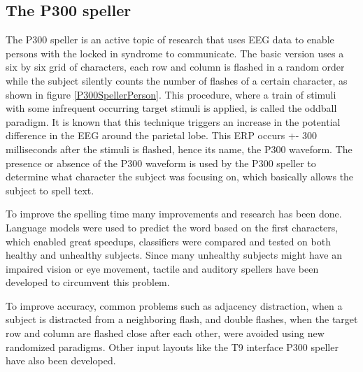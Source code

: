 
\subsection{The P300 speller}

The P300 speller is an active topic of research that uses EEG data to enable persons with the locked in syndrome to communicate\cite{P300Origin}. The basic version uses a six by six grid of characters, each row and column is flashed in a random order while the subject silently counts the number of flashes of a certain character, as shown in figure \ref{P300SpellerPerson}. This procedure, where a train of stimuli with some infrequent occurring target stimuli is applied, is called the oddball paradigm\cite{PaperThibault}. It is known that this technique triggers an increase in the potential difference in the EEG around the parietal lobe. This ERP occurs +- 300 milliseconds after the stimuli is flashed, hence its name, the P300 waveform\cite{ComparisonClassifications}. The presence or absence of the P300 waveform is used by the P300 speller to determine what character the subject was focusing on, which basically allows the subject to spell text. 


To improve the spelling time many improvements and research has been done. Language models were used to predict the word based on the first characters, which enabled great speedups\cite{LangModel}, classifiers were compared and tested on both healthy\cite{ClassTechniqueComp} and unhealthy subjects\cite{ComparisonClassifications}. Since many unhealthy subjects might have an impaired vision or eye movement, tactile\cite{TactileP300} and auditory\cite{AuditoryP300} spellers have been developed to circumvent this problem.

\npar

To improve accuracy, common problems such as adjacency distraction, when a subject is distracted from a neighboring flash, and double flashes, when the target row and column are flashed close after each other, were avoided using new randomized paradigms\cite{PaperThibault}. Other input layouts like the T9 interface P300 speller have also been developed\cite{P300T9}. 

\npar

